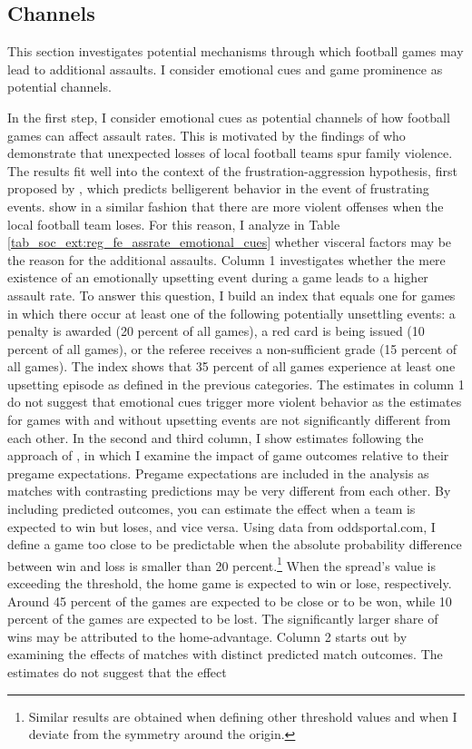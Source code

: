 \subsection{Channels}
This section investigates potential mechanisms through which football games may lead to additional assaults. I consider emotional cues and game prominence as potential channels.



In the first step, I consider emotional cues as potential channels of how football games can affect assault rates. This is motivated by the findings of \cite{card2011family} who demonstrate that unexpected losses of local football teams spur family violence. The results fit well into the context of the frustration-aggression hypothesis, first proposed by \cite{dollard1939frustration}, which predicts belligerent behavior in the event of frustrating events. \cite{rees2009college} show in a similar fashion that there are more violent offenses when the local football team loses. For this reason, I analyze in Table \ref{tab_soc_ext:reg_fe_assrate_emotional_cues} whether visceral factors may be the reason for the additional assaults. Column 1 investigates whether the mere existence of an emotionally upsetting event during a game leads to a higher assault rate. To answer this question, I build an index that equals one for games in which there occur at least one of the following potentially unsettling events: a penalty is awarded (20 percent of all games), a red card is being issued (10 percent of all games), or the referee receives a non-sufficient grade (15 percent of all games). The index shows that 35 percent of all games experience at least one upsetting episode as defined in the previous categories. The estimates in column 1 do not suggest that emotional cues trigger more violent behavior as the estimates for games with and without upsetting events are not significantly different from each other. 	In the second and third column, I show estimates following the approach of \cite{card2011family}, in which I examine the impact of game outcomes relative to their pregame expectations. Pregame expectations are included in the analysis as matches with contrasting predictions may be very different from each other. By including predicted outcomes, you can estimate the effect when a team is expected to win but loses, and vice versa. Using data from oddsportal.com, I define a game too close to be predictable when the absolute probability difference between win and loss is smaller than 20 percent.\footnote{Similar results are obtained when defining other threshold values and when I deviate from the symmetry around the origin.} When the spread's value is exceeding the threshold, the home game is expected to win or lose, respectively. Around 45 percent of the games are expected to be close or to be won, while 10 percent of the games are expected to be lost. The significantly larger share of wins may be attributed to the home-advantage. Column 2 starts out by examining the effects of matches with distinct predicted match outcomes. The estimates do not suggest that the effect 
